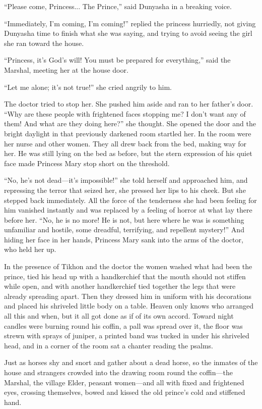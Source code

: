 ``Please come, Princess... The Prince,'' said Dunyasha in a
breaking voice.

``Immediately, I'm coming, I'm coming!'' replied the princess
hurriedly, not giving Dunyasha time to finish what she was
saying, and trying to avoid seeing the girl she ran toward the
house.

``Princess, it's God's will! You must be prepared for
everything,'' said the Marshal, meeting her at the house door.

``Let me alone; it's not true!'' she cried angrily to him.

The doctor tried to stop her. She pushed him aside and ran to her
father's door. ``Why are these people with frightened faces
stopping me?  I don't want any of them! And what are they doing
here?'' she thought.  She opened the door and the bright daylight
in that previously darkened room startled her. In the room were
her nurse and other women. They all drew back from the bed,
making way for her. He was still lying on the bed as before, but
the stern expression of his quiet face made Princess Mary stop
short on the threshold.

``No, he's not dead---it's impossible!'' she told herself and
approached him, and repressing the terror that seized her, she
pressed her lips to his cheek. But she stepped back
immediately. All the force of the tenderness she had been feeling
for him vanished instantly and was replaced by a feeling of
horror at what lay there before her. ``No, he is no more! He is
not, but here where he was is something unfamiliar and hostile,
some dreadful, terrifying, and repellent mystery!'' And hiding
her face in her hands, Princess Mary sank into the arms of the
doctor, who held her up.

In the presence of Tikhon and the doctor the women washed what
had been the prince, tied his head up with a handkerchief that
the mouth should not stiffen while open, and with another
handkerchief tied together the legs that were already spreading
apart. Then they dressed him in uniform with his decorations and
placed his shriveled little body on a table.  Heaven only knows
who arranged all this and when, but it all got done as if of its
own accord. Toward night candles were burning round his coffin, a
pall was spread over it, the floor was strewn with sprays of
juniper, a printed band was tucked in under his shriveled head,
and in a corner of the room sat a chanter reading the psalms.

Just as horses shy and snort and gather about a dead horse, so
the inmates of the house and strangers crowded into the drawing
room round the coffin---the Marshal, the village Elder, peasant
women---and all with fixed and frightened eyes, crossing
themselves, bowed and kissed the old prince's cold and stiffened
hand.

